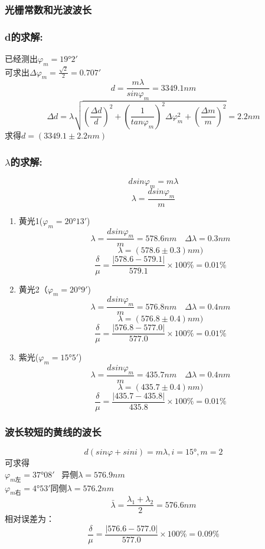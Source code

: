 \documentclass{thuemp}
\begin{document}
\subsubsection{光栅常数和光波波长}
\subsubsection*{d的求解:}
已经测出$\varphi _m = 19°2'$\\可求出$\Delta \varphi _m = \frac{\sqrt{2}}{2}=0.707'$
$$ d = \frac{m \lambda }{sin \varphi _m}=3349.1nm$$
$$\Delta d=\lambda\sqrt{(\frac{\Delta d }{d})^2+(\frac{1}{tan \varphi _m})^2\Delta\varphi _m^2+(\frac{\Delta m}{m})^2}=2.2nm$$
求得$d=(3349.1\pm2.2nm)$
\subsubsection*{$\lambda$的求解:}
$$d sin\varphi _m = m\lambda$$
$$\lambda = \frac{d sin\varphi _m}{m} $$
\begin{enumerate}
	\item 黄光1($\varphi _m=20°13'$)
	$$\lambda = \frac{d sin\varphi _m}{m} =578.6nm \quad \Delta \lambda = 0.3 nm$$
	$$\lambda = (578.6\pm0.3) nm)$$
	$$\frac{\delta}{\mu}=\frac{|578.6-579.1|}{579.1}\times 100\%= 0.01\%$$

	\item 黄光2（$\varphi _m=20°9'$)
	$$\lambda = \frac{d sin\varphi _m}{m} =576.8nm \quad \Delta \lambda = 0.4 nm$$
	$$\lambda = (576.8\pm0.4) nm)$$
	$$\frac{\delta}{\mu}=\frac{|576.8-577.0|}{577.0}\times 100\%= 0.01\%$$

	\item 紫光($\varphi _m=15°5'$)
	$$\lambda = \frac{d sin\varphi _m}{m} =435.7nm \quad \Delta \lambda = 0.4 nm$$
	$$\lambda = (435.7\pm0.4) nm)$$
	$$\frac{\delta}{\mu}=\frac{|435.7-435.8|}{435.8}\times 100\%= 0.01\%$$

\end{enumerate}
\subsubsection{波长较短的黄线的波长}
$$d(sin \varphi  +sin i )=m\lambda,i=15°,m=2$$可求得\\
$\varphi _{m左}=37°08'$ \ 异侧$\lambda=576.9nm$\\
$\varphi _{m右}=4°53'$\quad 同侧$\lambda=576.2nm$\\
$$\bar{\lambda}=\frac{\lambda_1+\lambda_2}{2}=576.6nm$$
相对误差为：
$$\frac{\delta}{\mu}=\frac{|576.6-577.0|}{577.0}\times 100\% = 0.09\%$$
\end{document}
